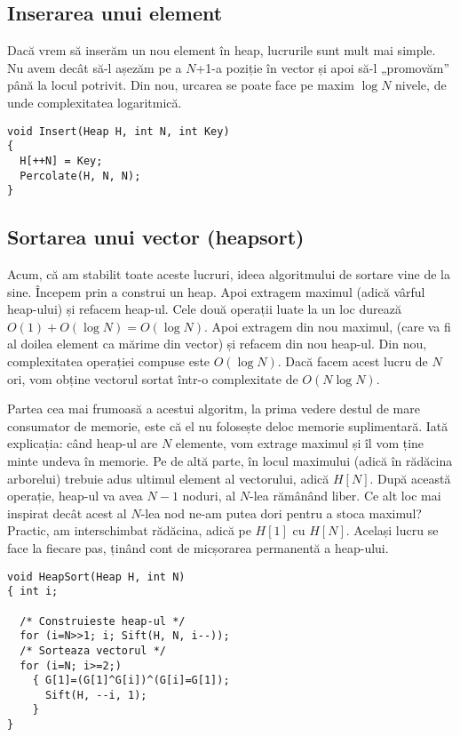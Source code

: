 \subsection{Inserarea unui element}

Dacă vrem să inserăm un nou element în heap, lucrurile sunt mult mai
simple. Nu avem decât să-l așezăm pe a $N$+1-a poziție în vector și apoi să-l
„promovăm” până la locul potrivit. Din nou, urcarea se poate face pe maxim
$\log N$ nivele, de unde complexitatea logaritmică.

\begin{verbatim}
void Insert(Heap H, int N, int Key)
{
  H[++N] = Key;
  Percolate(H, N, N);
}
\end{verbatim}

\subsection{Sortarea unui vector (heapsort)}

Acum, că am stabilit toate aceste lucruri, ideea algoritmului de sortare vine
de la sine. Începem prin a construi un heap. Apoi extragem maximul (adică
vârful heap-ului) și refacem heap-ul. Cele două operații luate la un loc
durează $O(1) + O(\log N) = O(\log N)$. Apoi extragem din nou maximul, (care
va fi al doilea element ca mărime din vector) și refacem din nou heap-ul. Din
nou, complexitatea operației compuse este $O(\log N)$. Dacă facem acest lucru
de $N$ ori, vom obține vectorul sortat într-o complexitate de $O(N \log N)$.

Partea cea mai frumoasă a acestui algoritm, la prima vedere destul de mare
consumator de memorie, este că el nu folosește deloc memorie
suplimentară. Iată explicația: când heap-ul are $N$ elemente, vom extrage
maximul și îl vom ține minte undeva în memorie. Pe de altă parte, în locul
maximului (adică în rădăcina arborelui) trebuie adus ultimul element al
vectorului, adică $H[N]$. După această operație, heap-ul va avea $N-1$ noduri,
al $N$-lea rămânând liber. Ce alt loc mai inspirat decât acest al $N$-lea nod
ne-am putea dori pentru a stoca maximul? Practic, am interschimbat rădăcina,
adică pe $H[1]$ cu $H[N]$. Același lucru se face la fiecare pas, ținând cont
de micșorarea permanentă a heap-ului.

\begin{verbatim}
void HeapSort(Heap H, int N)
{ int i;

  /* Construieste heap-ul */
  for (i=N>>1; i; Sift(H, N, i--));
  /* Sorteaza vectorul */
  for (i=N; i>=2;)
    { G[1]=(G[1]^G[i])^(G[i]=G[1]);
      Sift(H, --i, 1);
    }
}
\end{verbatim}

